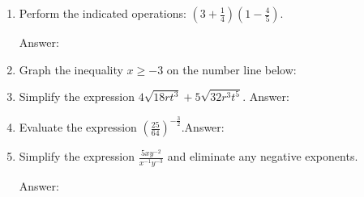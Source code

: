 \documentclass[11pt]{article}
\begin{document}
\begin{enumerate}

\item Perform the indicated operations: $(3+\frac{1}{4})(1-\frac{4}{5}).$\\
\begin{flushright}{Answer: \underline{\hspace{2in}}}\end{flushright}

\vfill
\item Graph the inequality $x \geq -3$ on the number line below:\\

\vspace{2in}


\item Simplify the expression $4 \sqrt{18rt^3} + 5 \sqrt{32r^3t^5}.$ \hfill Answer: \underline{\hspace{2in}}\\
\vspace{1in}

\item Evaluate the expression $\left(\frac{25}{64}\right)^{-\frac{3}{2}}.$\hfill Answer: \underline{\hspace{2in}}\\
\vspace{0.5in}





\item Simplify the expression $\frac{5xy^{-2}}{x^{-1}y^{-3}} $ and eliminate any negative exponents.\\
\begin{flushright}{Answer: \underline{\hspace{2in}}}\end{flushright}


\end{enumerate}
\end{document}
